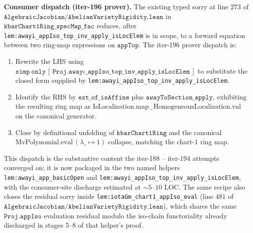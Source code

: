 \noindent\textbf{Consumer dispatch (iter-196 prover).} The existing
typed sorry at line \(273\) of
\(\mathtt{AlgebraicJacobian/AbelianVarietyRigidity.lean}\) in
\(\mathtt{kbarChart1Ring\_specMap\_fac}\) reduces, after
\texttt{lem:awayi_appIso_top_inv_apply_isLocElem} is in scope, to a
forward equation between two ring-map expressions on
\(\mathtt{appTop}\). The iter-196 prover dispatch is:
\begin{enumerate}
  \item Rewrite the LHS using
    \(\mathtt{simp\ only}\,[\,\mathtt{Proj.awayι\_appIso\_top\_inv\_apply\_isLocElem}\,]\)
    to substitute the closed form supplied by
    \texttt{lem:awayi_appIso_top_inv_apply_isLocElem}.
  \item Identify the RHS by \(\mathtt{ext\_of\_isAffine}\) plus
    \(\mathtt{awayToSection\_apply}\), exhibiting the resulting ring map as
    \(\mathrm{IsLocalization.map}\,\_\,\mathrm{HomogeneousLocalization.val}\)
    on the canonical generator.
  \item Close by definitional unfolding of \(\mathtt{kbarChart1Ring}\)
    and the canonical
    \(\mathrm{MvPolynomial.eval}\,(\lambda \_ \mapsto 1)\) collapse,
    matching the chart-\(1\) ring map.
\end{enumerate}
This dispatch is the substantive content the iter-188 -- iter-194
attempts converged on; it is now packaged in the two named helpers
\texttt{lem:awayi_app_basicOpen} and
\texttt{lem:awayi_appIso_top_inv_apply_isLocElem}, with the consumer-site
discharge estimated at \(\sim 5\)--\(10\) LOC. The same recipe also closes
the residual sorry inside \texttt{lem:iotaGm_chart1_appIso_eval} (line
\(481\) of \(\mathtt{AlgebraicJacobian/AbelianVarietyRigidity.lean}\)),
which shares the same \(\mathtt{Proj.appIso}\) evaluation residual modulo
the iso-chain functoriality already discharged in stages 5--8 of that
helper's proof.

